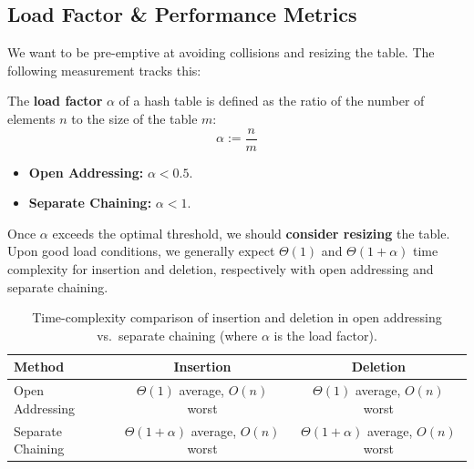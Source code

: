 \newpage 

\subsection{Load Factor \& Performance Metrics}

\noindent
We want to be pre-emptive at avoiding collisions and resizing the table. The following measurement tracks this:

\begin{Def}

    \label{def:load_factor}

    The \textbf{load factor} \(\alpha\) of a hash table is defined as the ratio of the number of elements \(n\) to the size of the table \(m\):
    \[
        \alpha :=  \frac{n}{m}
    \]

    \begin{itemize}
        \item \textbf{Open Addressing:} $\alpha < 0.5$.
        \item \textbf{Separate Chaining:} $\alpha < 1$.
    \end{itemize}

    \noindent
    Once $\alpha$ exceeds the optimal threshold, we should \textbf{consider resizing} the table. Upon good load conditions, we
    generally expect $\Theta(1)$ and $\Theta(1 + \alpha)$ time complexity for insertion and deletion, respectively with open addressing and separate chaining.
\end{Def}

\begin{table}[ht!]
    \centering
    \begin{tabular}{l|c|c}
        \hline
        Method & Insertion & Deletion \\
        \hline
        Open Addressing       & \(\Theta (1)\) average, \(O(n)\) worst & \(\Theta (1)\) average, \(O(n)\) worst \\
        Separate Chaining     & \(\Theta(1 + \alpha)\) average, \(O(n)\) worst & \(\Theta(1 + \alpha)\) average, \(O(n)\) worst \\
        \hline
    \end{tabular}
    \caption{Time-complexity comparison of insertion and deletion in open addressing vs.\ separate chaining (where \(\alpha\) is the load factor).}
    \label{tab:hash_complexities}
\end{table}


